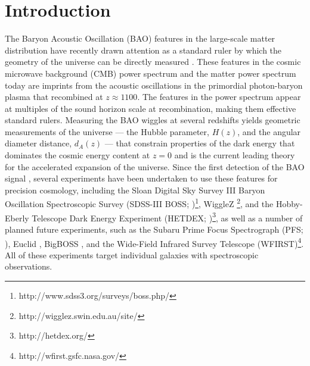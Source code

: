 \documentclass[10pt,iop]{emulateapj}
\begin{document}

\section{Introduction}

The Baryon Acoustic Oscillation (BAO) features in the large-scale
matter distribution have recently drawn attention as a standard ruler
by which the geometry of the universe can be directly measured 
\citep{eisenstein_et_al_1998,eisenstein_et_al_1999}.
These features in the cosmic microwave background (CMB)
power spectrum and the matter power spectrum today are
imprints from the acoustic oscillations in the primordial photon-baryon plasma
that recombined at $z\approx1100$. The features in the power spectrum
appear at multiples of 
the sound horizon scale at recombination, making them effective 
standard rulers.  Measuring the BAO wiggles at several
redshifts yields geometric measurements of the universe --- the Hubble
parameter, $H(z)$, and the angular diameter distance, $d_A(z)$ --- that
constrain properties of the dark energy that dominates the cosmic energy
content at $z=0$ and is the current leading theory for the accelerated expansion
of the universe.  Since the first detection of the BAO signal
\citep{eisenstein_et_al_2005}, several experiments have been undertaken
to use these features for precision cosmology, including the Sloan
Digital Sky Survey III Baryon Oscillation Spectroscopic Survey
(SDSS-III BOSS;
\citealt{schlegel_et_al_2009})\footnote{http://www.sdss3.org/surveys/boss.php/},
WiggleZ
\citep{drinkwater_et_al_2010}\footnote{http://wigglez.swin.edu.au/site/},
and the Hobby-Eberly Telescope Dark Energy Experiment
(HETDEX; \citealt{adams_et_al_2011})\footnote{http://hetdex.org/},
as well as a number of planned future experiments, such as the
Subaru Prime Focus Spectrograph (PFS; \citealt{ellis_et_al_2012}),
Euclid \citep{amendola_et_al_2012}, BigBOSS \citep{schlegel_et_al_2011},
and the Wide-Field Infrared Survey Telescope (WFIRST)\footnote{http://wfirst.gsfc.nasa.gov/}.
All of these experiments target individual galaxies with spectroscopic
observations.
\end{document}

